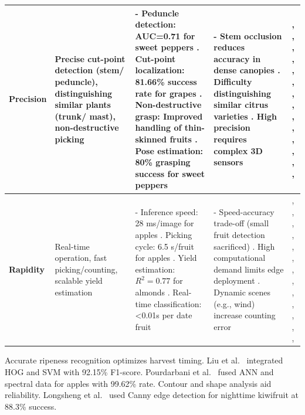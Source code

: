 \documentclass[a4paper,fleqn]{cas-dc}
\begin{document}
\begin{table}[htbp]
\begin{tabular}{@{}p{1.5cm}p{2.5cm}p{5cm}p{4cm}p{2.5cm}@{}}
	\textbf{Precision} & Precise cut-point \newline detection (stem/ peduncle), distinguishing similar plants (trunk/ mast), non-destructive picking & - Peduncle detection: AUC=0.71 for sweet peppers \cite{sa2017peduncle}. Cut-point localization: 81.66\% success rate for grapes \cite{luo2018vision}. Non-destructive grasp: Improved handling of thin-skinned fruits \cite{CHEN2024111082}. Pose estimation: 80\% grasping success for sweet peppers \cite{lehnert2016sweet} & - Stem occlusion reduces accuracy in dense canopies \cite{sa2017peduncle}. Difficulty distinguishing similar citrus varieties \cite{lin2020fruit}. High precision requires complex 3D sensors \cite{kusumam20173d} & \cite{kusumam20173d}, \cite{andujar2016using}, \cite{lehnert2016sweet}, \cite{bac2017performance}, \cite{mendes2016vine}, \cite{sa2017peduncle}, \cite{luo2018vision}, \cite{kirk2020b}, \cite{perez2018pattern}, \cite{liu2019mature}, \cite{pourdarbani2020automatic}, \cite{lin2020fruit}, \cite{luo2018vision}, \cite{peng2020semantic}, \cite{CHEN2024111082}\\ \midrule
	\textbf{Rapidity} & Real-time operation, fast picking/counting, scalable yield estimation & - Inference speed: 28 ms/image for apples \cite{kang2020fast}. Picking cycle: 6.5 s/fruit for apples \cite{kang2020real}. Yield estimation: $R^2=0.77$ for almonds \cite{underwood2016mapping}. Real-time classification: <0.01s per date fruit \cite{altaheri2019date} & - Speed-accuracy trade-off (small fruit detection sacrificed) \cite{kang2020fast}. High computational demand limits edge deployment \cite{kang2019fruit}. Dynamic scenes (e.g., wind) increase counting error \cite{PAL2024104567} & \cite{onishi2019automated}, \cite{underwood2016mapping}, \cite{lin2019guava}, \cite{kang2019fruit}, \cite{kang2020fruit}, \cite{lin2019field}, \cite{xiang2019fruit}, \cite{mao2020automatic}, \cite{barth2016design}, \cite{birrell2020field}, \cite{kang2020real}, \cite{altaheri2019date},  \cite{kang2020fast},  \cite{PAL2024104567} \\ \bottomrule

	\end{tabular}
\end{table}
\fi

Accurate ripeness recognition optimizes harvest timing. 
Liu et al.~\cite{liu2019mature} integrated HOG and SVM with 92.15\% F1-score. 
Pourdarbani et al.~\cite{pourdarbani2020automatic} fused ANN and spectral data for apples with 99.62\% rate.
Contour and shape analysis aid reliability. 
Longsheng et al.~\cite{longsheng2015kiwifruit} used Canny edge detection for nighttime kiwifruit at 88.3\% success.
\end{document}
